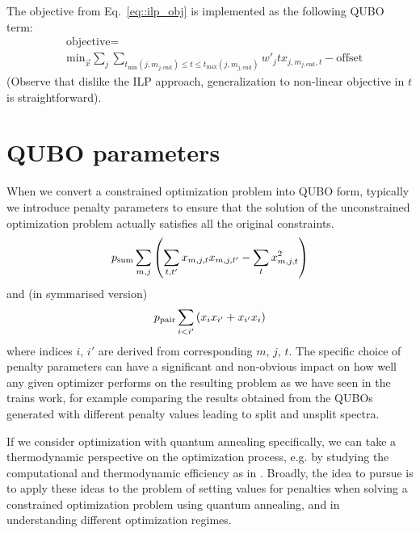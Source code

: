 \documentclass[aps,pra,amsmath,amssymb,amsfonts,lengthcheck,twocolumn,superscriptaddress]{revtex4-1}
\begin{document}
The objective from Eq.~\eqref{eq::ilp_obj} is implemented as the following QUBO term:
\begin{equation}
\begin{split}
    &\text{objective} = \\ & \text{min}_{\vec{x}}  \sum_j \sum_{t_{\min}(j, m_{j, \text{end}}) \leq t \leq t_{\max}(j, m_{j, \text{end}})} w'_j t   x_{j, m_{j, \text{end}}, t} - \text{offset}
    \label{eq::ilp_obj}
\end{split}
\end{equation}
(Observe that dislike the ILP approach, generalization to non-linear objective in $t$ is straightforward).


\section{QUBO parameters}

When we convert a constrained optimization problem into QUBO form, typically we introduce penalty parameters to ensure that the solution of the unconstrained optimization problem actually satisfies all the original constraints.
\begin{align}
\label{eq::sum_to_one}
    p_{\rm sum}\sum_{m,j}\pqty{\sum_{t,t'} x_{m,j,t}x_{m,j,t'} - \sum_{t} x_{m,j,t}^2}
\end{align}
and (in symmarised version)
\begin{align}
\label{eq::pair}
    p_{\rm pair}\sum_{i<i'}\pqty{x_i x_{i'} + x_{i'} x_i}
\end{align}
where indices $i$, $i'$ are derived from corresponding $m$, $j$, $t$.
The specific choice of penalty parameters can have a significant and non-obvious impact on how well any given optimizer performs on the resulting problem as we have seen in the trains work, for example comparing the results obtained from the QUBOs generated with different penalty values leading to split and unsplit spectra.

If we consider optimization with quantum annealing specifically, we can take a thermodynamic perspective on the optimization process, e.g. by studying the computational and thermodynamic efficiency as in \cite{Smierzchalski2024}. 
Broadly, the idea to pursue is to apply these ideas to the problem of setting values for penalties when solving a constrained optimization problem using quantum annealing, and in understanding different optimization regimes. 
\end{document}
